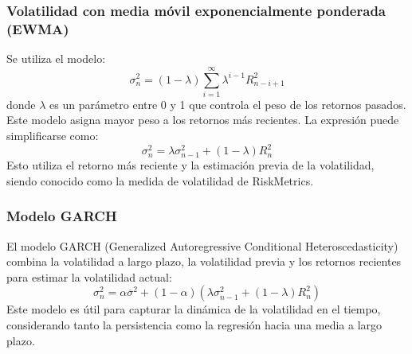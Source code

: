 \subsubsection{Volatilidad con media móvil exponencialmente ponderada (EWMA)}
Se utiliza el modelo:
\[
\sigma_n^2 = (1 - \lambda) \sum_{i=1}^{\infty} \lambda^{i-1} R_{n-i+1}^2
\]
donde $\lambda$ es un parámetro entre 0 y 1 que controla el peso de los retornos pasados. Este modelo asigna mayor peso a los retornos más recientes. La expresión puede simplificarse como:
\[
\sigma_n^2 = \lambda \sigma_{n-1}^2 + (1 - \lambda) R_n^2
\]
Esto utiliza el retorno más reciente y la estimación previa de la volatilidad, siendo conocido como la medida de volatilidad de RiskMetrics.


\subsubsection{Modelo GARCH}
El modelo GARCH (Generalized Autoregressive Conditional Heteroscedasticity) combina la volatilidad a largo plazo, la volatilidad previa y los retornos recientes para estimar la volatilidad actual:
\[
\sigma_n^2 = \alpha \overline{\sigma}^2 + (1 - \alpha) \left( \lambda \sigma_{n-1}^2 + (1 - \lambda) R_n^2 \right)
\]
Este modelo es útil para capturar la dinámica de la volatilidad en el tiempo, considerando tanto la persistencia como la regresión hacia una media a largo plazo.



